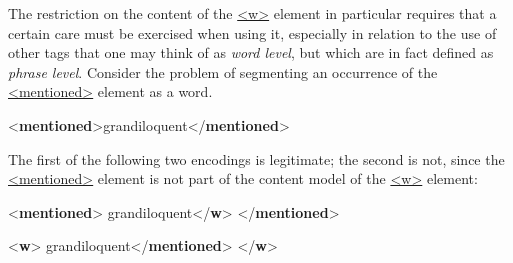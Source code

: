 The restriction on the content of the \hyperref[TEI.w]{<w>} element in particular requires that a certain care must be exercised when using it, especially in relation to the use of other tags that one may think of as \textit{word level}, but which are in fact defined as \textit{phrase level}. Consider the problem of segmenting an occurrence of the \hyperref[TEI.mentioned]{<mentioned>} element as a word. \par\bgroup{}\exampleFont \begin{shaded}\noindent\mbox{}{<\textbf{mentioned}>}grandiloquent{</\textbf{mentioned}>}\end{shaded}\egroup\par \noindent  The first of the following two encodings is legitimate; the second is not, since the \hyperref[TEI.mentioned]{<mentioned>} element is not part of the content model of the \hyperref[TEI.w]{<w>} element: \par\bgroup{}\exampleFont \begin{shaded}\noindent\mbox{}{<\textbf{mentioned}>}\mbox{}\newline 
{}grandiloquent{</\textbf{w}>}\mbox{}\newline 
{</\textbf{mentioned}>}\end{shaded}\egroup\par \noindent  \par\bgroup\exampleFont \begin{shaded}\noindent\mbox{}{<\textbf{w}>}\mbox{}\newline 
{}grandiloquent{</\textbf{mentioned}>}\mbox{}\newline 
{</\textbf{w}>}\end{shaded}\egroup\par \par
